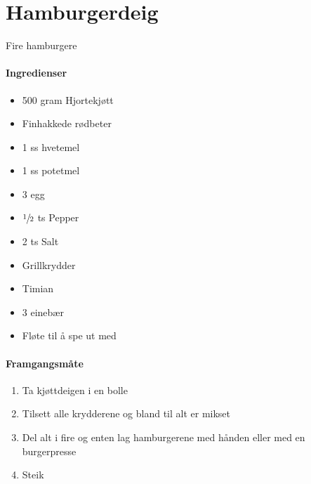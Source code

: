 \section{Hamburgerdeig}
Fire hamburgere

%
\paragraph{Ingredienser}
\begin{itemize}[noitemsep]
	\item 500 gram Hjortekjøtt
	\item	Finhakkede rødbeter
	\item	1 ss hvetemel
	\item	1 ss potetmel
	\item	3 egg
	\item	 $\sfrac{1}{2}$  ts Pepper
	\item	2 ts Salt
	\item	Grillkrydder
	\item	Timian
	\item	3 einebær
	\item	Fløte til å spe ut med
\end{itemize}

\paragraph{Framgangsmåte}
\begin{enumerate}[noitemsep]
	\item Ta kjøttdeigen i en bolle
	\item Tilsett alle krydderene og bland til alt er mikset
	\item Del alt i fire og enten lag hamburgerene med hånden eller med en burgerpresse
	\item Steik
\end{enumerate}

